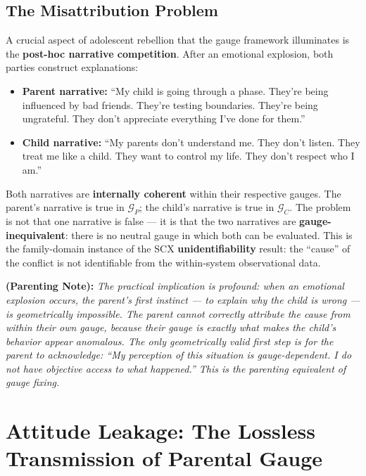 \documentclass[11pt,a4paper]{article}
\newcommand{\cG}{\mathcal{G}}
\newcommand{\parentnote}[1]{%
  \medskip\noindent
  \textbf{ (Parenting Note):} \textit{#1}%
}
\begin{document}
\subsection{The Misattribution Problem}

A crucial aspect of adolescent rebellion that the gauge framework illuminates is the \textbf{post-hoc narrative competition}. After an emotional explosion, both parties construct explanations:

\begin{itemize}
    \item \textbf{Parent narrative:} ``My child is going through a phase. They're being influenced by bad friends. They're testing boundaries. They're being ungrateful. They don't appreciate everything I've done for them.''
    \item \textbf{Child narrative:} ``My parents don't understand me. They don't listen. They treat me like a child. They want to control my life. They don't respect who I am.''
\end{itemize}

Both narratives are \textbf{internally coherent} within their respective gauges. The parent's narrative is true in $\cG_P$; the child's narrative is true in $\cG_C$. The problem is not that one narrative is false — it is that the two narratives are \textbf{gauge-inequivalent}: there is no neutral gauge in which both can be evaluated. This is the family-domain instance of the SCX \textbf{unidentifiability} result: the ``cause'' of the conflict is not identifiable from the within-system observational data.

\parentnote{The practical implication is profound: when an emotional explosion occurs, the parent's first instinct — to explain why the child is wrong — is geometrically impossible. The parent \textit{cannot} correctly attribute the cause from within their own gauge, because their gauge is exactly what makes the child's behavior appear anomalous. The only geometrically valid first step is for the parent to acknowledge: ``My perception of this situation is gauge-dependent. I do not have objective access to what happened.'' This is the parenting equivalent of gauge fixing.}

\section{Attitude Leakage: The Lossless Transmission of Parental Gauge}
\label{sec:leakage}
\end{document}
